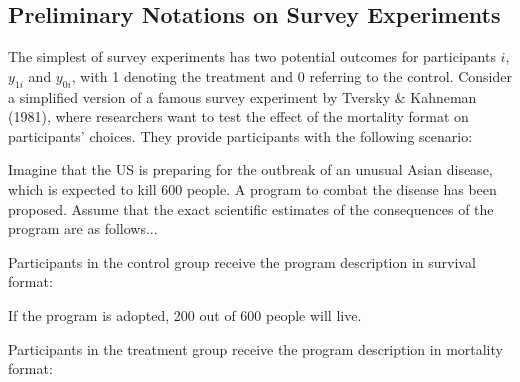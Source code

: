\documentclass[12pt,econ]{sources/authesis}
\begin{document}
\hypertarget{ordblock-theory-experiments}{%
\subsection{Preliminary Notations on Survey Experiments}\label{ordblock-theory-experiments}}

The simplest of survey experiments has two potential outcomes for participants \(i\), \(y_{1i}\) and \(y_{0i}\), with 1 denoting the treatment and 0 referring to the control. Consider a simplified version of a famous survey experiment by Tversky \& Kahneman (1981), where researchers want to test the effect of the mortality format on participants' choices. They provide participants with the following scenario:

\vspace{0.3cm}
\begin{adjustwidth}{50pt}{50pt}
\ssp
\noindent Imagine that the US is preparing for the outbreak of an unusual Asian disease, which is expected to kill 600 people. A program to combat the disease has been proposed. Assume that the exact scientific estimates of the consequences of the program are as follows...
\end{adjustwidth}
Participants in the control group receive the program description in survival format:

\vspace{0.3cm}
\begin{adjustwidth}{50pt}{50pt}
\ssp
\noindent If the program is adopted, 200 out of 600 people will live.
\end{adjustwidth}
Participants in the treatment group receive the program description in mortality format:
\end{document}
